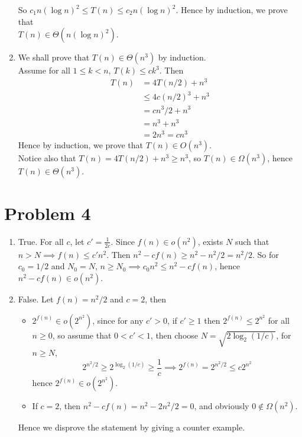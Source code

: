 \documentclass[12pt, a4paper]{article}
\begin{document}
\begin{enumerate}
    So $c_1 n (\log n)^2 \leq T(n) \leq c_2 n (\log n)^2$. 
    Hence by induction, we prove that \\ $T(n) \in \Theta(n (\log n)^2)$.

  \item We shall prove that $T(n) \in \Theta(n^3)$ by induction. \\
    Assume for all $1 \leq k < n$, $T(k) \leq ck^3$. Then
    \begin{align*}
      T(n) &= 4 T(n/2) + n^3 \\
      &\leq 4 c (n/2)^3 + n^3 \\
      &= c n^3/2 + n^3 \\
      &= n^3 + n^3 \\
      &= 2 n^3 = c n^3
    \end{align*}
    Hence by induction, we prove that $T(n) \in O(n^3)$. \\
    Notice also that $T(n) = 4T(n/2) + n^3 \geq n^3$, 
    so $T(n) \in \Omega(n^3)$, hence $T(n) \in \Theta(n^3)$.
\end{enumerate}
\section{Problem 4}
\begin{enumerate}
  \item True. For all $c$, let $c' = \frac{1}{2c}$. 
    Since $f(n) \in o(n^2)$, exists $N$ such that $n > N \implies f(n) \leq c'n^2$.
    Then $n^2 - cf(n) \geq n^2 - n^2/2 = n^2 / 2$. So for $c_0 = 1/2$ and $N_0 = N$, 
    $n \geq N_0 \implies c_0n^2 \leq n^2 - c f(n)$, hence $n^2 - cf(n) \in o(n^2)$.
  \item False. Let $f(n) = n^2 / 2$ and $c = 2$, then
    \begin{itemize}
      \item $2^{f(n)} \in o(2^{n^2})$, since for any $c' > 0$, if $c' \geq 1$ then $2^{f(n)} \leq 2^{n^2}$
        for all $n \geq 0$, so assume that $0 < c' < 1$, then choose $N = \sqrt{2 \log_2 (1/c)}$, for
        $n \geq N$, 
        \[ 2^{n^2/2} \geq 2^{\log_2(1/c)} \geq \frac{1}{c} \implies 2^{f(n)} = 2^{n^2/2} \leq c 2^{n^2} \]
        hence $2^{f(n)} \in o(2^{n^2})$.
      \item If $c = 2$, then $n^2 - cf(n) = n^2 - 2 n^2/2 = 0$, and obviously $0 \notin \Omega(n^2)$.
    \end{itemize}
    Hence we disprove the statement by giving a counter example.
\end{enumerate}
\end{document}
